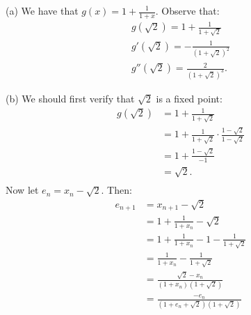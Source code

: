 \documentclass[12pt,twoside,openany]{memoir}
\begin{document}
    \begin{solution}
        (a) We have that $g(x) = 1 + \frac{1}{1+x}$. Observe that:
            \begin{equation*}
            \begin{split}
                g(\sqrt{2}) = 1 + \frac{1}{1 + \sqrt{2}} \\
                g'(\sqrt{2}) = -\frac{1}{(1+\sqrt{2})^2} \\
                g''(\sqrt{2}) = \frac{2}{(1+\sqrt{2})^3}.
            \end{split}
            \end{equation*}

        (b) We should first verify that $\sqrt{2}$ is a fixed point:
            \begin{equation*}
            \begin{split}
                g (\sqrt{2})
                & = 1 + \frac{1}{1 + \sqrt{2}} \\
                & = 1 + \frac{1}{1 + \sqrt{2}} \cdot \frac{1 - \sqrt{2}}{1-\sqrt{2}} \\
                & = 1 + \frac{1- \sqrt{2}}{-1} \\
                & = \sqrt{2}. \\
            \end{split}
            \end{equation*}
        Now let $e_n = x_n - \sqrt{2}$. Then:
            \begin{equation*}
            \begin{split}
                e_{n+1} 
                & = x_{n+1} - \sqrt{2} \\
                & = 1 + \frac{1}{1+x_n} - \sqrt{2} \\
                & = 1 + \frac{1}{1 + x_n} - 1 - \frac{1}{1 + \sqrt{2}} \\
                & = \frac{1}{1 + x_n} - \frac{1}{ 1 + \sqrt{2}} \\
                & = \frac{\sqrt{2} - x_n}{(1+x_n)(1 + \sqrt{2})} \\
                & = \frac{-e_n}{(1+e_n + \sqrt{2})(1 + \sqrt{2})}
            \end{split}
            \end{equation*}


\end{solution}
\end{document}
